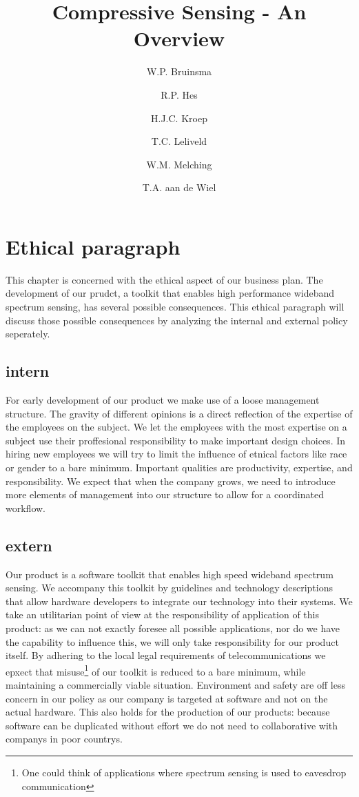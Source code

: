 \documentclass[a4paper, openany, oneside]{memoir}
\title{Compressive Sensing - An Overview}
\author{W.P. Bruinsma \and R.P. Hes \and H.J.C. Kroep \and T.C. Leliveld \and W.M. Melching \and T.A. aan de Wiel}
\begin{document}
\section{Ethical paragraph}
This chapter is concerned with the ethical aspect of our business plan. The development of our prudct, a toolkit that enables high performance wideband spectrum sensing, has several possible consequences. This ethical paragraph will discuss those possible consequences by analyzing the internal and external policy seperately.

\subsection{intern}

For early development of our product we make use of a loose management structure. The gravity of different opinions is a direct reflection of the expertise of the employees on the subject. We let the employees with the most expertise on a subject use their proffesional responsibility to make important design choices. In hiring new employees we will try to limit the influence of etnical factors like race or gender to a bare minimum. Important qualities are productivity, expertise, and responsibility. We expect that when the company grows, we need to introduce more elements of management into our structure to allow for a coordinated workflow.


\subsection{extern}

Our product is a software toolkit that enables high speed wideband spectrum sensing. We accompany this toolkit by guidelines and technology descriptions that allow hardware developers to integrate our technology into their systems. We take an utilitarian point of view at the responsibility of application of this product: as we can not exactly foresee all possible applications, nor do we have the capability to influence this, we will only take responsibility for our product itself. By adhering to the local legal requirements of telecommunications we epxect that misuse\footnote{One could think of applications where spectrum sensing is used to eavesdrop communication} of our toolkit is reduced to a bare minimum, while maintaining a commercially viable situation. Environment and safety are off less concern in our policy as our company is targeted at software and not on the actual hardware. This also holds for the production of our products: because software can be duplicated without effort we do not need to collaborative with companys in poor countrys.
\end{document}
